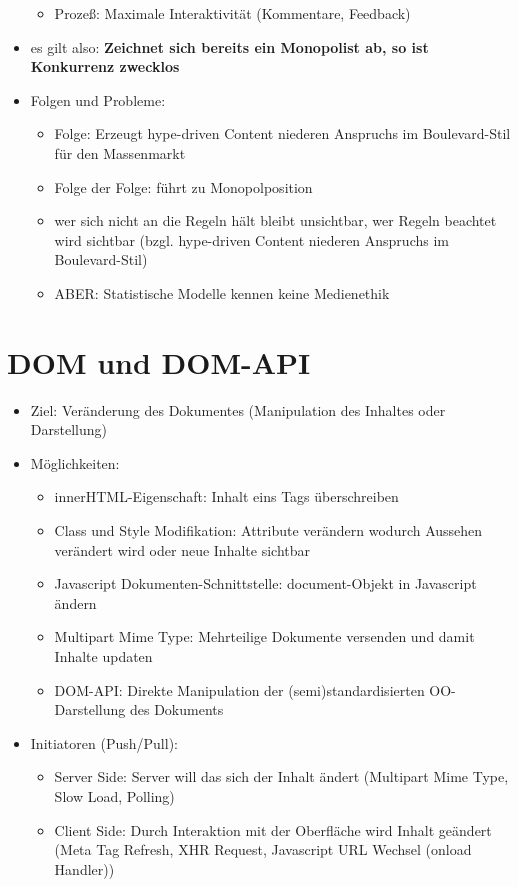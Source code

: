 \documentclass{article} %
\begin{document}
\begin{itemize}
\begin{itemize}
			\item Prozeß: Maximale Interaktivität (Kommentare, Feedback)
		\end{itemize}
		\item es gilt also: \textbf{Zeichnet sich bereits ein Monopolist ab, so ist Konkurrenz zwecklos}
		\item Folgen und Probleme:
		\begin{itemize}
			\item Folge: Erzeugt hype-driven Content niederen Anspruchs im Boulevard-Stil für den Massenmarkt
			\item Folge der Folge: führt zu Monopolposition
			\item wer sich nicht an die Regeln hält bleibt unsichtbar, wer Regeln beachtet wird sichtbar (bzgl. hype-driven Content niederen Anspruchs im Boulevard-Stil)
			\item ABER: Statistische Modelle kennen keine Medienethik
		\end{itemize}
	\end{itemize}
	\section{DOM und DOM-API}
	\begin{itemize}
		\item Ziel: Veränderung des Dokumentes (Manipulation des Inhaltes oder Darstellung)
		\item Möglichkeiten:
		\begin{itemize}
			\item innerHTML-Eigenschaft: Inhalt eins Tags überschreiben
			\item Class und Style Modifikation: Attribute verändern wodurch Aussehen verändert wird oder neue Inhalte sichtbar
			\item Javascript Dokumenten-Schnittstelle: document-Objekt in Javascript ändern
			\item Multipart Mime Type: Mehrteilige Dokumente versenden und damit Inhalte updaten
			\item DOM-API: Direkte Manipulation der (semi)standardisierten OO-Darstellung des Dokuments
		\end{itemize}
		\item Initiatoren (Push/Pull):
		\begin{itemize}
			\item Server Side: Server will das sich der Inhalt ändert (Multipart Mime Type, Slow Load, Polling)
			\item Client Side: Durch Interaktion mit der Oberfläche wird Inhalt geändert (Meta Tag Refresh, XHR Request, Javascript URL Wechsel (onload Handler))
		\end{itemize}
	\end{itemize}
\end{document}
